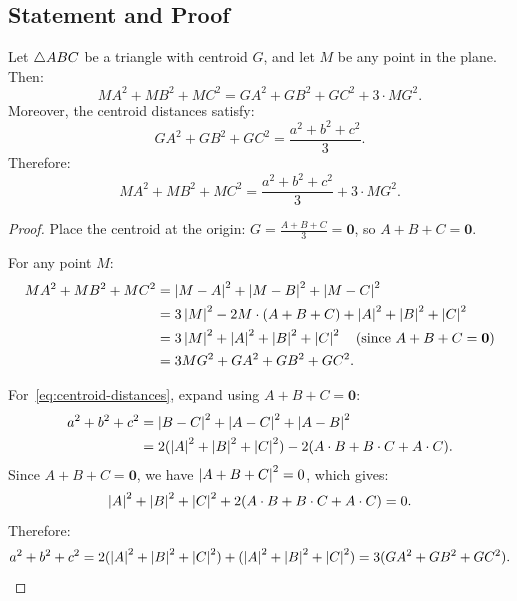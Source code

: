 \subsection{Statement and Proof}

\begin{theorem}
\label{thm:leibniz}
Let $\triangle ABC$ be a triangle with centroid $G$, and let $M$ be any point in the plane. Then:
\begin{equation}
\label{eq:leibniz}
MA^2 + MB^2 + MC^2 = GA^2 + GB^2 + GC^2 + 3 \cdot MG^2.
\end{equation}
Moreover, the centroid distances satisfy:
\begin{equation}
\label{eq:centroid-distances}
GA^2 + GB^2 + GC^2 = \frac{a^2 + b^2 + c^2}{3}.
\end{equation}
Therefore:
\begin{equation}
\label{eq:leibniz-combined}
MA^2 + MB^2 + MC^2 = \frac{a^2 + b^2 + c^2}{3} + 3 \cdot MG^2.
\end{equation}
\end{theorem}

\begin{proof}
Place the centroid at the origin: $G = \frac{A + B + C}{3} = \mathbf{0}$, so $A + B + C = \mathbf{0}$.

For any point $M$:
\begin{align}
MA^2 + MB^2 + MC^2 &= \left\lvert M - A \right\rvert^2 + \left\lvert M - B \right\rvert^2 + \left\lvert M - C \right\rvert^2 \\
&= 3\left\lvert M \right\rvert^2 - 2M \cdot (A + B + C) + \left\lvert A \right\rvert^2 + \left\lvert B \right\rvert^2 + \left\lvert C \right\rvert^2 \\
&= 3\left\lvert M \right\rvert^2 + \left\lvert A \right\rvert^2 + \left\lvert B \right\rvert^2 + \left\lvert C \right\rvert^2 \quad (\text{since } A + B + C = \mathbf{0}) \\
&= 3 MG^2 + GA^2 + GB^2 + GC^2.
\end{align}

For~\eqref{eq:centroid-distances}, expand using $A + B + C = \mathbf{0}$:
\begin{align}
a^2 + b^2 + c^2 &= \left\lvert B - C \right\rvert^2 + \left\lvert A - C \right\rvert^2 + \left\lvert A - B \right\rvert^2 \\
&= 2(\left\lvert A \right\rvert^2 + \left\lvert B \right\rvert^2 + \left\lvert C \right\rvert^2) - 2(A \cdot B + B \cdot C + A \cdot C).
\end{align}
Since $A + B + C = \mathbf{0}$, we have $\left\lvert A + B + C \right\rvert^2 = 0$, which gives:
\begin{equation}
\left\lvert A \right\rvert^2 + \left\lvert B \right\rvert^2 + \left\lvert C \right\rvert^2 + 2(A \cdot B + B \cdot C + A \cdot C) = 0.
\end{equation}
Therefore:
\begin{equation}
a^2 + b^2 + c^2 = 2(\left\lvert A \right\rvert^2 + \left\lvert B \right\rvert^2 + \left\lvert C \right\rvert^2) + (\left\lvert A \right\rvert^2 + \left\lvert B \right\rvert^2 + \left\lvert C \right\rvert^2) = 3(GA^2 + GB^2 + GC^2). \qedhere
\end{equation}
\end{proof}

